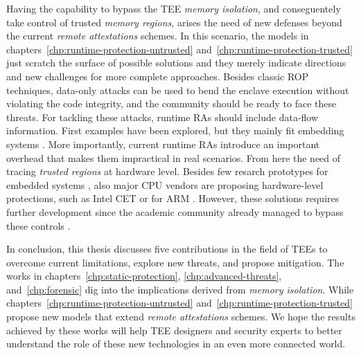 Having the capability to bypass the TEE \emph{memory isolation}, and 
conseguentely take control of trusted  \emph{memory regions}, arises the need 
of new defenses beyond the current \emph{remote attestations} schemes.
In this scenario, the models in chapters~\ref{chp:runtime-protection-untrusted} 
and~\ref{chp:runtime-protection-trusted} just scratch the surface of 
possible solutions and they merely indicate directions and new challenges for 
more complete approaches.
Besides classic ROP techniques, data-only attacks can be used to bend the 
enclave execution without violating the code integrity, and the community 
should be ready to face these threats.
For tackling these attacks, runtime RAs should include data-flow information.
First examples have been explored, but they mainly fit embedding systems 
\citep{sun2020oat,aberadiat}.
More importantly, current runtime RAs introduce an important overhead 
that makes them impractical in real scenarios.
From here the need of tracing \emph{trusted regions} at hardware level.
Besides few resarch prototypes for embedded systems 
\citep{Dessouky:2018:LLH:3240765.3240821}, also major CPU vendors are proposing 
hardware-level protections, such as Intel CET \citep{intelcet} or for ARM 
\citep{armpa}.
However, these solutions requires further development since the academic 
community already managed to bypass these controls \citep{van2012memory}.

In conclusion, this thesis discusses five contributions in the field of TEEs to 
overcome current limitations, explore new threats, and propose mitigation.
The works in chapters~\ref{chp:static-protection}, \ref{chp:advanced-threats}, 
and~\ref{chp:forensic} dig into the implications derived from \emph{memory 
isolation}.
While chapters~\ref{chp:runtime-protection-untrusted} 
and~\ref{chp:runtime-protection-trusted} propose new models that extend 
\emph{remote attestations} schemes.
We hope the results achieved by these works will help TEE designers and 
security experts to better understand the role of these new technologies in 
an even more connected world.


